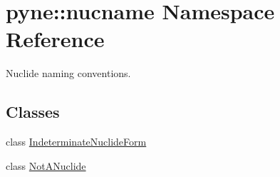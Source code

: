 \hypertarget{namespacepyne_1_1nucname}{}\section{pyne\+:\+:nucname Namespace Reference}
\label{namespacepyne_1_1nucname}


Nuclide naming conventions.  


\subsection*{Classes}
\begin{DoxyCompactItemize}
\item 
class \hyperlink{classpyne_1_1nucname_1_1_indeterminate_nuclide_form}{Indeterminate\+Nuclide\+Form}
\item 
class \hyperlink{classpyne_1_1nucname_1_1_not_a_nuclide}{Not\+A\+Nuclide}
\end{DoxyCompactItemize}
